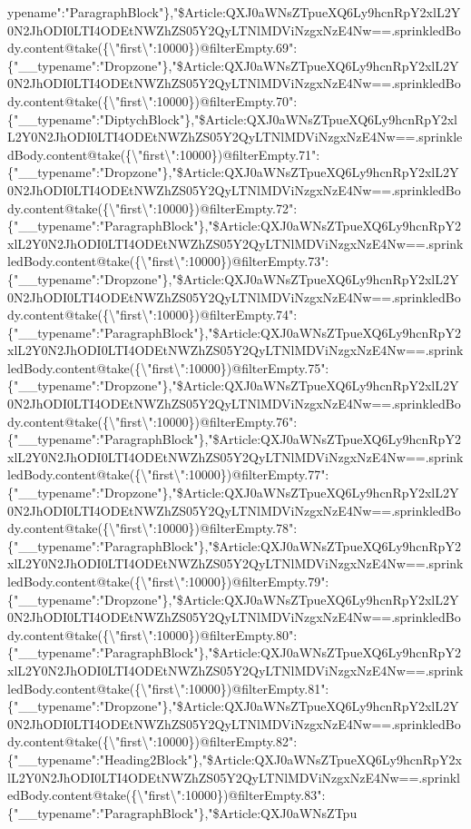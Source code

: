 ypename":"ParagraphBlock"\},"\$Article:QXJ0aWNsZTpueXQ6Ly9hcnRpY2xlL2Y0N2JhODI0LTI4ODEtNWZhZS05Y2QyLTNlMDViNzgxNzE4Nw==.sprinkledBody.content@take(\{\textbackslash{}"first\textbackslash{}":10000\})@filterEmpty.69":\{"\_\_typename":"Dropzone"\},"\$Article:QXJ0aWNsZTpueXQ6Ly9hcnRpY2xlL2Y0N2JhODI0LTI4ODEtNWZhZS05Y2QyLTNlMDViNzgxNzE4Nw==.sprinkledBody.content@take(\{\textbackslash{}"first\textbackslash{}":10000\})@filterEmpty.70":\{"\_\_typename":"DiptychBlock"\},"\$Article:QXJ0aWNsZTpueXQ6Ly9hcnRpY2xlL2Y0N2JhODI0LTI4ODEtNWZhZS05Y2QyLTNlMDViNzgxNzE4Nw==.sprinkledBody.content@take(\{\textbackslash{}"first\textbackslash{}":10000\})@filterEmpty.71":\{"\_\_typename":"Dropzone"\},"\$Article:QXJ0aWNsZTpueXQ6Ly9hcnRpY2xlL2Y0N2JhODI0LTI4ODEtNWZhZS05Y2QyLTNlMDViNzgxNzE4Nw==.sprinkledBody.content@take(\{\textbackslash{}"first\textbackslash{}":10000\})@filterEmpty.72":\{"\_\_typename":"ParagraphBlock"\},"\$Article:QXJ0aWNsZTpueXQ6Ly9hcnRpY2xlL2Y0N2JhODI0LTI4ODEtNWZhZS05Y2QyLTNlMDViNzgxNzE4Nw==.sprinkledBody.content@take(\{\textbackslash{}"first\textbackslash{}":10000\})@filterEmpty.73":\{"\_\_typename":"Dropzone"\},"\$Article:QXJ0aWNsZTpueXQ6Ly9hcnRpY2xlL2Y0N2JhODI0LTI4ODEtNWZhZS05Y2QyLTNlMDViNzgxNzE4Nw==.sprinkledBody.content@take(\{\textbackslash{}"first\textbackslash{}":10000\})@filterEmpty.74":\{"\_\_typename":"ParagraphBlock"\},"\$Article:QXJ0aWNsZTpueXQ6Ly9hcnRpY2xlL2Y0N2JhODI0LTI4ODEtNWZhZS05Y2QyLTNlMDViNzgxNzE4Nw==.sprinkledBody.content@take(\{\textbackslash{}"first\textbackslash{}":10000\})@filterEmpty.75":\{"\_\_typename":"Dropzone"\},"\$Article:QXJ0aWNsZTpueXQ6Ly9hcnRpY2xlL2Y0N2JhODI0LTI4ODEtNWZhZS05Y2QyLTNlMDViNzgxNzE4Nw==.sprinkledBody.content@take(\{\textbackslash{}"first\textbackslash{}":10000\})@filterEmpty.76":\{"\_\_typename":"ParagraphBlock"\},"\$Article:QXJ0aWNsZTpueXQ6Ly9hcnRpY2xlL2Y0N2JhODI0LTI4ODEtNWZhZS05Y2QyLTNlMDViNzgxNzE4Nw==.sprinkledBody.content@take(\{\textbackslash{}"first\textbackslash{}":10000\})@filterEmpty.77":\{"\_\_typename":"Dropzone"\},"\$Article:QXJ0aWNsZTpueXQ6Ly9hcnRpY2xlL2Y0N2JhODI0LTI4ODEtNWZhZS05Y2QyLTNlMDViNzgxNzE4Nw==.sprinkledBody.content@take(\{\textbackslash{}"first\textbackslash{}":10000\})@filterEmpty.78":\{"\_\_typename":"ParagraphBlock"\},"\$Article:QXJ0aWNsZTpueXQ6Ly9hcnRpY2xlL2Y0N2JhODI0LTI4ODEtNWZhZS05Y2QyLTNlMDViNzgxNzE4Nw==.sprinkledBody.content@take(\{\textbackslash{}"first\textbackslash{}":10000\})@filterEmpty.79":\{"\_\_typename":"Dropzone"\},"\$Article:QXJ0aWNsZTpueXQ6Ly9hcnRpY2xlL2Y0N2JhODI0LTI4ODEtNWZhZS05Y2QyLTNlMDViNzgxNzE4Nw==.sprinkledBody.content@take(\{\textbackslash{}"first\textbackslash{}":10000\})@filterEmpty.80":\{"\_\_typename":"ParagraphBlock"\},"\$Article:QXJ0aWNsZTpueXQ6Ly9hcnRpY2xlL2Y0N2JhODI0LTI4ODEtNWZhZS05Y2QyLTNlMDViNzgxNzE4Nw==.sprinkledBody.content@take(\{\textbackslash{}"first\textbackslash{}":10000\})@filterEmpty.81":\{"\_\_typename":"Dropzone"\},"\$Article:QXJ0aWNsZTpueXQ6Ly9hcnRpY2xlL2Y0N2JhODI0LTI4ODEtNWZhZS05Y2QyLTNlMDViNzgxNzE4Nw==.sprinkledBody.content@take(\{\textbackslash{}"first\textbackslash{}":10000\})@filterEmpty.82":\{"\_\_typename":"Heading2Block"\},"\$Article:QXJ0aWNsZTpueXQ6Ly9hcnRpY2xlL2Y0N2JhODI0LTI4ODEtNWZhZS05Y2QyLTNlMDViNzgxNzE4Nw==.sprinkledBody.content@take(\{\textbackslash{}"first\textbackslash{}":10000\})@filterEmpty.83":\{"\_\_typename":"ParagraphBlock"\},"\$Article:QXJ0aWNsZTpu